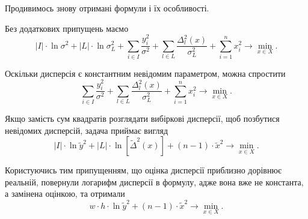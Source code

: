 Продивимось знову отримані формули і їх особливості.

Без додаткових припущень маємо
\begin{equation*}
  \left| I \right| \cdot \ln{\sigma^2}
  + \left| L \right| \cdot \ln{\sigma_L^2}
  + \sum_{i \in I} \frac{y_i^2}{\sigma^2}
  + \sum_{l \in L} \frac{\Delta_l^2\left( x \right)}{\sigma_L^2}
  + \sum_{i = 1}^n x_i^2
  \to \min\limits_{x \in X}.
\end{equation*}

Оскільки дисперсія є константним невідомим параметром,
можна спростити
\begin{equation}\label{eq:energy:common}
  \sum_{i \in I} \frac{y_i^2}{\sigma^2}
  + \sum_{l \in L} \frac{\Delta_l^2\left( x \right)}{\sigma_L^2}
  + \sum_{i = 1}^n x_i^2
  \to \min\limits_{x \in X}.
\end{equation}

Якщо замість сум квадратів розглядати вибіркові дисперсії,
щоб позбутися невідомих дисперсій, задача приймає вигляд
\begin{equation*}
  \left| I \right|
  \cdot \ln{\widetilde{y}^2}
  + \left| L \right|
  \cdot \ln{\left[ \widetilde{\Delta}^2\left( x \right) \right]}
  + \left( n - 1 \right) \cdot \widetilde{x}^2
  \to \min\limits_{x \in X}.
\end{equation*}

Користуючись тим припущенням,
що оцінка дисперсії приблизно дорівнює реальній,
повернули логарифм дисперсії в формулу,
адже вона вже не константа, а замінена оцінкою, та отримали
\begin{equation*}
  w \cdot h \cdot \ln{\widetilde{y}^2}
  + \left( n - 1 \right) \cdot \widetilde{x}^2
  \to \min\limits_{x \in X}.
\end{equation*}

